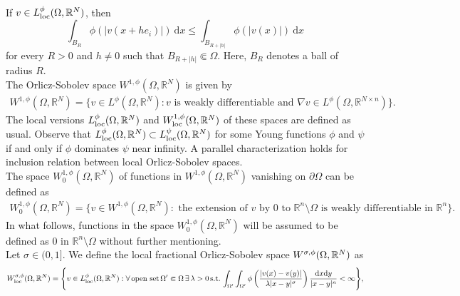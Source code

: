 \documentclass[leqno,11pt]{amsart}%
\numberwithin{equation}{section}
\def\Rn{{\mathbb R}^{n}}
\def\rn{\Rn}
\def\d{\mathrm{d}}
\def\dx{\d x}
\theoremstyle{definition}
\numberwithin{equation}{section}
\begin{document}
\\ If $v\in L^{\phi}_{\rm loc}(\Omega, \mathbb R^N)$, then
\begin{equation}\label{est-translation}
\int_{B_{R}} \phi(|v(x+he_i)|)\ \dx\leq  \int_{B_{R+|h|}}\phi(|v(x)|)\ \dx 
\end{equation}
for every $R>0$ and $h \neq 0$ such that $B_{R+|h|} \Subset \Omega$. Here, $B_R$ denotes a ball of radius $R$.
\\ The Orlicz-Sobolev space $W^{1,\phi}(\Omega, \mathbb R^N)$ is  given by
\begin{align}
    \label{orliczsobolev}
    W^{1,\phi} (\Omega, \mathbb R^N)= \big\{v \in L^\phi (\Omega, \mathbb R^N): v \,\,\text{is weakly differentiable and}\,\, \nabla v \in L^\phi(\Omega, \mathbb R^{N\times n})\big\}.
\end{align}
The local versions $L^\phi _{\rm loc}(\Omega, \mathbb R^N)$
and $W^{1,\phi}_{\rm loc} (\Omega, \mathbb R^N)$ of these spaces are defined as usual.   Observe that $L^\phi _{\rm loc}(\Omega, \mathbb R^N)\subset L^\psi _{\rm loc}(\Omega, \mathbb R^N)$ for some Young functions $\phi$ and $\psi$ if and only if $\phi$ dominates $\psi$ near infinity. A parallel characterization holds for inclusion relation between local Orlicz-Sobolev spaces. 
\\
The space $W^{1,\phi}_0 (\Omega, \mathbb R^N)$ of functions in $W^{1,\phi} (\Omega, \mathbb R^N)$ vanishing on $\partial \Omega$ can be defined as
\begin{align}
    \label{orliczsobolev0}
    W^{1,\phi}_0 (\Omega, \mathbb R^N)= \big\{v \in W^{1,\phi} (\Omega, \mathbb R^N):  \,\,\text{the extension of $v$ by $0$ to $\mathbb R^n\setminus \Omega$ is weakly differentiable in $\mathbb R^n $}\big\}.
\end{align}
In what follows, functions in the space $W^{1,\phi}_0 (\Omega, \mathbb R^N)$ will be assumed to be defined as $0$ in $\rn \setminus \Omega$ without further mentioning.
\\
Let $\sigma \in (0,1]$. 
 We define the local fractional Orlicz-Sobolev space $W^{\sigma, \phi}_{\rm}(\Omega, \mathbb R^N)$ as 
\begin{equation}\label{fractional-semi-norm}
  W^{\sigma, \phi}_{\rm loc}(\Omega, \mathbb R^N) =\Bigg\{v\in L^\phi_{\rm loc}(\Omega, \mathbb R^N): \forall \, \text{open set}\, \Omega' \Subset \Omega \, \exists \,\lambda>0 \, \text{s.t.}\,\int_{\Omega'}\int_{\Omega'}
    \phi\left(\frac{|v(x)-v(y)|}{\lambda|x-y|^{\sigma}}\right)\frac{\dx\d y}{|x-y|^{n}}<\infty\Bigg\},
\end{equation}
\end{document}

